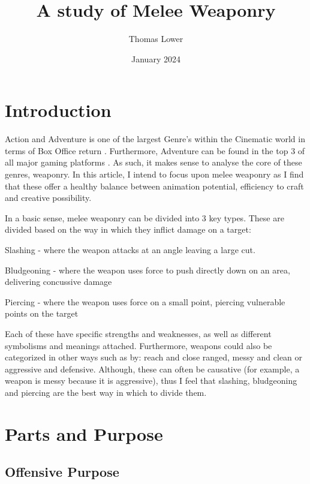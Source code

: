\documentclass{article}
\title{A study of Melee Weaponry}
\author{Thomas Lower}
\date{January 2024}
\begin{document}
\maketitle

\pagebreak

\tableofcontents

\pagebreak

\section{Introduction}
Action and Adventure is one of the largest Genre's within the Cinematic world in terms of Box Office return \parencite{1}. Furthermore, Adventure can be found in the top 3 of all major gaming platforms \parencite{2}. As such, it makes sense to analyse the core of these genres, weaponry. In this article, I intend to focus upon melee weaponry as I find that these offer a healthy balance between animation potential, efficiency to craft and creative possibility.


In a basic sense, melee weaponry can be divided into 3 key types. These are divided based on the way in which they inflict damage on a target:
\begin{list}{-}{}
    \item Slashing - where the weapon attacks at an angle leaving a large cut.
    \item Bludgeoning - where the weapon uses force to push directly down on an area, delivering concussive damage
    \item Piercing - where the weapon uses force on a small point, piercing vulnerable points on the target
\end{list}
\parencite{bozkir2024just}

Each of these have specific strengths and weaknesses, as well as different symbolisms and meanings attached. Furthermore, weapons could also be categorized in other ways such as by: reach and close ranged, messy and clean or aggressive and defensive. Although, these can often be causative (for example, a weapon is messy because it is aggressive), thus I feel that slashing, bludgeoning and piercing are the best way in which to divide them.

\pagebreak
\section{Parts and Purpose}

\subsection{Offensive Purpose}
\end{document}

